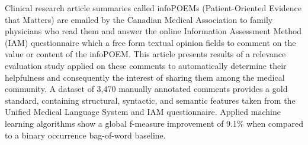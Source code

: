Clinical research article summaries called infoPOEMs (Patient-Oriented Evidence that Matters) are emailed by the Canadian Medical Association to family physicians who read them and answer the online Information Assessment Method (IAM) questionnaire which a free form textual opinion fields to comment on the value or content of the infoPOEM. This article presents results of a relevance evaluation study applied on these comments to automatically determine their helpfulness and consequently the interest of sharing them among the medical community. A dataset of 3,470 manually annotated comments provides a gold standard, containing structural, syntactic, and semantic features taken from the Unified Medical Language System and IAM questionnaire. Applied machine learning algorithms show a global f-measure improvement of 9.1\% when compared to a binary occurrence bag-of-word baseline.
